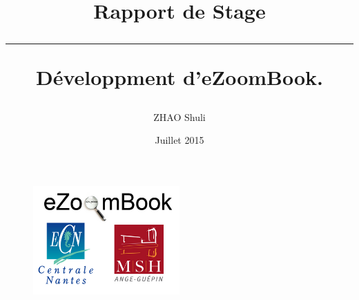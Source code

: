 \documentclass{report}
\begin{document}
\begin{spacing}{1.5}
\begin{titlepage}

\title{Rapport de Stage \vspace{6mm}\\ \hrule Développment d'eZoomBook.}

\author{ZHAO Shuli}

\date{Juillet 2015}

\begin{figure}[H]
\centering
\includegraphics[width=0.5\textwidth]{logo}
\end{figure}

\end{titlepage}


\maketitle

\tableofcontents






\end{spacing}
\end{document}
